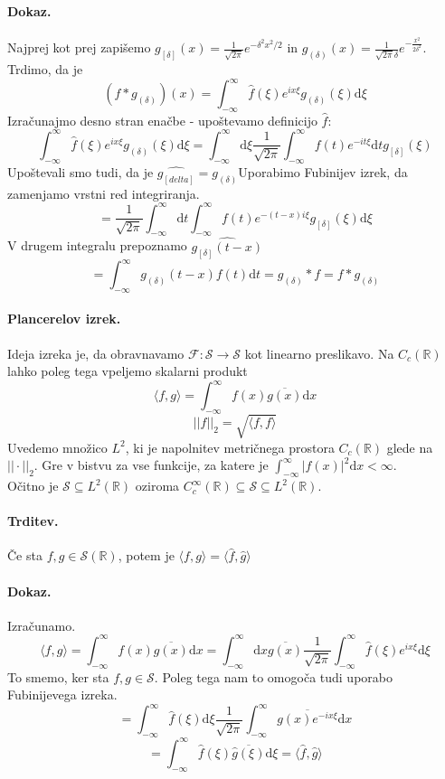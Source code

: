 \documentclass[a4paper]{article}
\newcommand{\dif}{\mathrm{d}}
\newcommand{\R}{\mathbb{R}}
\newcommand{\fn}[3]{{#1}\colon {#2} \rightarrow {#3}}
\newcommand{\avg}[1]{\langle {#1} \rangle}
\newcommand{\Int}{\int_{-\infty}^{\infty}}
\begin{document}
\paragraph{Dokaz.} Najprej kot prej zapišemo $\displaystyle{g_{[\delta]}(x) = \frac{1}{\sqrt{2\pi}}e^{-\delta^2x^2/2}}$
in $\displaystyle{g_{(\delta)}(x) = \frac{1}{\sqrt{2\pi}\delta}e^{-\frac{x^2}{2\delta^2}}}$. Trdimo, da je
$$(f * g_{(\delta)})(x) = \Int \widehat{f} (\xi) e^{ix\xi} g_{(\delta)}(\xi)\dif\xi$$
Izračunajmo desno stran enačbe - upoštevamo definicijo $\widehat{f}$:
$$\Int \widehat{f} (\xi) e^{ix\xi} g_{(\delta)}(\xi)\dif\xi = \Int \dif\xi \frac{1}{\sqrt{2\pi}}\Int f(t)e^{-it\xi}\dif t g_{[\delta]}(\xi)$$
Upoštevali smo tudi, da je $\widehat{g_{[delta]}} = g_{(\delta)}$Uporabimo Fubinijev izrek, da zamenjamo vrstni red integriranja.
$$= \frac{1}{\sqrt{2\pi}}\Int\dif t\Int f(t)e^{-(t-x)i\xi}g_{[\delta]}(\xi)\dif\xi$$
V drugem integralu prepoznamo $\widehat{g_{[\delta]}(t-x)}$
$$= \Int g_{(\delta)}(t-x)f(t)\dif t = g_{(\delta)}*f = f*g_{(\delta)}$$
\paragraph{Plancerelov izrek.} Ideja izreka je, da obravnavamo $\fn{\mathcal{F}}{\mathcal{S}}{\mathcal{S}}$ kot linearno preslikavo. Na $C_c(\R)$ lahko
poleg tega vpeljemo skalarni produkt
$$\avg{f, g} = \Int f(x)\overline{g(x)}\dif x$$
$$||f||_2 = \sqrt{\avg{f, f}}$$
Uvedemo množico $L^2$, ki je napolnitev metričnega prostora $C_c(\R)$ glede na $||\cdot||_2$.
Gre v bistvu za vse funkcije, za katere je $\displaystyle{\Int |f(x)|^2\dif x < \infty}$. \\
Očitno je $\mathcal{S} \subseteq L^2(\R)$ oziroma $C_c^\infty(\R) \subseteq \mathcal{S} \subseteq L^2(\R)$.
\paragraph{Trditev.} Če sta $f, g \in \mathcal{S}(\R)$, potem je $\avg{f, g} = \avg{\widehat{f}, \widehat{g}}$
\paragraph{Dokaz.} Izračunamo.
$$\avg{f, g} = \Int f(x)\overline{g(x)}\dif x = \Int \dif x \overline{g(x)} \frac{1}{\sqrt{2\pi}} \Int \widehat{f}(\xi)e^{ix\xi}\dif\xi$$
To smemo, ker sta $f, g \in \mathcal{S}$. Poleg tega nam to omogoča tudi uporabo Fubinijevega izreka.
$$=\Int \widehat{f}(\xi)\dif\xi \frac{1}{\sqrt{2\pi}} \Int \overline{g(x)e^{-ix\xi}}\dif x$$
$$= \Int \widehat{f}(\xi)\overline{\widehat{g}(\xi)}\dif\xi = \avg{\widehat{f}, \widehat{g}}$$
\end{document}
